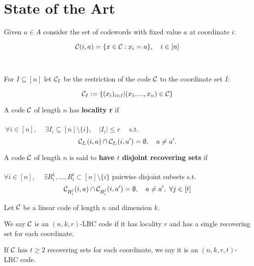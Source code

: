 \section{State of the Art}
\begin{frame}
    Given $a \in A$ consider the set of codewords with fixed value $a$ at coordinate $i$:

    $$ \mathcal{C} (i,a) = \{ x \in \mathcal{C} : x_i = a \}, \quad i \in [n] $$ \\~\\
    
    For $I \subseteq [n]$ let $\mathcal{C}_I$ be the restriction of the code $\mathcal{C}$ to the coordinate set $I$:
    
    $$\mathcal{C}_I := \{(x_i)_{ i \in I } \vert (x_1, ..., x_n) \in \mathcal{C}\}$$
    
        
\end{frame}

\begin{frame}
    \begin{defn}
        A code $\mathcal{C}$ of length $n$ has \textbf{locality r} if \\~\\
        
        $\ \forall i \in [n ]$, $\quad \exists I_i \subseteq [n] \setminus \{i\}, \quad \vert I_i \vert \leq r \quad $ s.t.         
        $$\mathcal{C}_{I_i} (i,a) \cap \mathcal{C}_{I_i} (i,a') = \emptyset, \quad a \neq a'.$$
    \end{defn}
    
	\begin{defn}
	    A code $\mathcal{C}$ of length $n$ is said to \textbf{have $t$ disjoint recovering sets} if \\~\\
	    
	    $\forall i \in [n]$, $\quad \exists R_i^1, ..., R_i^t \subset [n] \setminus \{i\}$ pairwise disjoint subsets
	    s.t. 
	    $$\mathcal{C}_{R_i^j} (i,a) \cap \mathcal{C}_{R_i^j} (i,a') = \emptyset, \quad a \neq a', \ \forall j \in [t]$$
	\end{defn}
\end{frame}

\begin{frame}
Let $\mathcal{C}$ be a linear code of length $n$ and dimension $k$.

We say $\mathcal{C}$ is an $(n,k,r)$-LRC code if it has locality $r$ and has a single recovering set for each coordinate.

If $\mathcal{C}$ has $t \geq 2$ recovering sets for each coordinate, we say it is an $(n,k,r,t)$-LRC code.

\end{frame}

